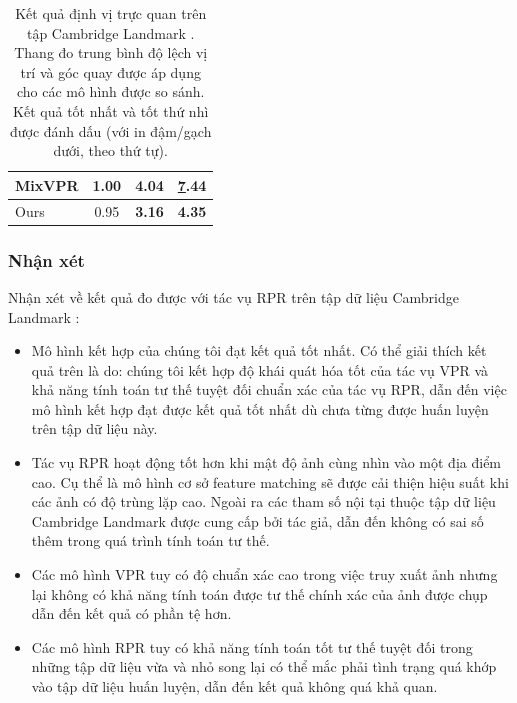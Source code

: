 \begin{table}[]
\begin{tabular}{|l|c|c|c|}
MixVPR \cite{alibey2023mixvpr}         & 1.00                                                     & 4.04                                                        & {\ul 7.44}                                                      \\ \hline
Ours                                           & 0.95                                                     & \textbf{3.16}                                               & \textbf{4.35}                                                   \\ \hline
\end{tabular}
\vspace{10pt}
\caption[Kết quả định vị trực quan trên tập Cambridge Landmark]{Kết quả định vị trực quan trên tập Cambridge Landmark \cite{kendall2016posenet}. Thang đo trung bình độ lệch vị trí và góc quay được áp dụng cho các mô hình được so sánh. Kết quả tốt nhất và tốt thứ nhì được đánh dấu (với in đậm/gạch dưới, theo thứ tự).}
\end{table}
\egroup

\subsubsection*{Nhận xét}
Nhận xét về kết quả đo được với tác vụ RPR trên tập dữ liệu Cambridge Landmark \cite{kendall2016posenet}:
\begin{itemize}
	\item Mô hình kết hợp của chúng tôi đạt kết quả tốt nhất. Có thể giải thích kết quả trên là do: chúng tôi kết hợp độ khái quát hóa tốt của tác vụ VPR và khả năng tính toán tư thế tuyệt đối chuẩn xác của tác vụ RPR, dẫn đến việc mô hình kết hợp đạt được kết quả tốt nhất dù chưa từng được huấn luyện trên tập dữ liệu này. 
	\item Tác vụ RPR hoạt động tốt hơn khi mật độ ảnh cùng nhìn vào một địa điểm cao. Cụ thể là mô hình cơ sở feature matching sẽ được cải thiện hiệu suất khi các ảnh có độ trùng lặp cao. Ngoài ra các tham số nội tại thuộc tập dữ liệu Cambridge Landmark được cung cấp bởi tác giả, dẫn đến không có sai số thêm trong quá trình tính toán tư thế. 
	\item Các mô hình VPR tuy có độ chuẩn xác cao trong việc truy xuất ảnh nhưng lại không có khả năng tính toán được tư thế chính xác của ảnh được chụp dẫn đến kết quả có phần tệ hơn.
	\item Các mô hình RPR tuy có khả năng tính toán tốt tư thế tuyệt đối trong những tập dữ liệu vừa và nhỏ song lại có thể mắc phải tình trạng quá khớp vào tập dữ liệu huấn luyện, dẫn đến kết quả không quá khả quan.
\end{itemize}

